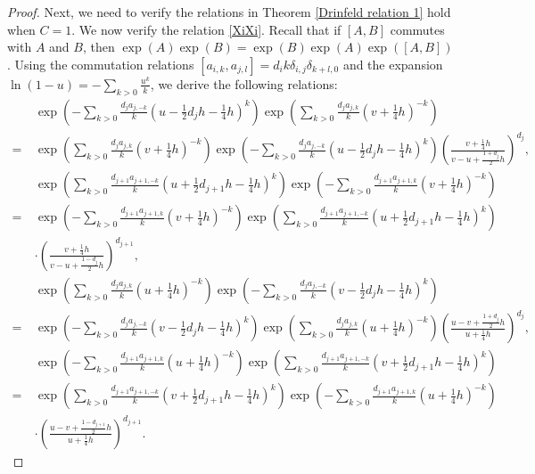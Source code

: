 \documentclass[a4paper,12pt]{article}
\numberwithin{equation}{section}
\begin{document}
\begin{proof}
Next, we need to verify the relations in Theorem \ref{Drinfeld relation 1} hold when $C=1$. We now verify the relation \eqref{XiXi}. Recall that if $[A,B]$ commutes with $A$ and $B$, then $\exp (A)\exp (B)=\exp (B)\exp (A)\exp ([A,B])$. Using the commutation relations $[a_{i,k},a_{j,l}]=d_{i}k\delta_{i,j}\delta_{k+l,0}$ and the expansion $\ln (1-u)=-\sum_{k>0}\frac{u^{k}}{k}$, we derive the following relations:
\begin{align*}
&\exp \left(-\sum_{k>0}\frac{d_{j}a_{j,-k}}{k}\left(u-\frac{1}{2}d_{j}h-\frac{1}{4}h\right)^{k}\right)\exp \left(\sum_{k>0}\frac{d_{j}a_{j,k}}{k}\left(v+\frac{1}{4}h\right)^{-k}\right)\\
=~&\exp \left(\sum_{k>0}\frac{d_{j}a_{j,k}}{k}\left(v+\frac{1}{4}h\right)^{-k}\right)\exp \left(-\sum_{k>0}\frac{d_{j}a_{j,-k}}{k}\left(u-\frac{1}{2}d_{j}h-\frac{1}{4}h\right)^{k}\right)\left(\frac{v+\frac{1}{4}h}{v-u+\frac{1+d_{j}}{2}h}\right)^{d_{j}},\\
&\exp \left(\sum_{k>0}\frac{d_{j+1}a_{j+1,-k}}{k}\left(u+\frac{1}{2}d_{j+1}h-\frac{1}{4}h\right)^{k}\right)\exp \left(-\sum_{k>0}\frac{d_{j+1}a_{j+1,k}}{k}\left(v+\frac{1}{4}h\right)^{-k}\right)\\
=~&\exp \left(-\sum_{k>0}\frac{d_{j+1}a_{j+1,k}}{k}\left(v+\frac{1}{4}h\right)^{-k}\right)\exp \left(\sum_{k>0}\frac{d_{j+1}a_{j+1,-k}}{k}\left(u+\frac{1}{2}d_{j+1}h-\frac{1}{4}h\right)^{k}\right)\\
&\cdot \left(\frac{v+\frac{1}{4}h}{v-u+\frac{1-d_{j}}{2}h}\right)^{d_{j+1}},\\
&\exp \left(\sum_{k>0}\frac{d_{j}a_{j,k}}{k}\left(u+\frac{1}{4}h\right)^{-k}\right)\exp \left(-\sum_{k>0}\frac{d_{j}a_{j,-k}}{k}\left(v-\frac{1}{2}d_{j}h-\frac{1}{4}h\right)^{k}\right)\\
=~&\exp \left(-\sum_{k>0}\frac{d_{j}a_{j,-k}}{k}\left(v-\frac{1}{2}d_{j}h-\frac{1}{4}h\right)^{k}\right)\exp \left(\sum_{k>0}\frac{d_{j}a_{j,k}}{k}\left(u+\frac{1}{4}h\right)^{-k}\right)\left(\frac{u-v+\frac{1+d_{j}}{2}h}{u+\frac{1}{4}h}\right)^{d_{j}},\\
&\exp \left(-\sum_{k>0}\frac{d_{j+1}a_{j+1,k}}{k}\left(u+\frac{1}{4}h\right)^{-k}\right)\exp \left(\sum_{k>0}\frac{d_{j+1}a_{j+1,-k}}{k}\left(v+\frac{1}{2}d_{j+1}h-\frac{1}{4}h\right)^{k}\right)\\
=~&\exp \left(\sum_{k>0}\frac{d_{j+1}a_{j+1,-k}}{k}\left(v+\frac{1}{2}d_{j+1}h-\frac{1}{4}h\right)^{k}\right)\exp \left(-\sum_{k>0}\frac{d_{j+1}a_{j+1,k}}{k}\left(u+\frac{1}{4}h\right)^{-k}\right)\\
&\cdot \left(\frac{u-v+\frac{1-d_{j+1}}{2}h}{u+\frac{1}{4}h}\right)^{d_{j+1}}.

\end{align*}
\end{proof}
\end{document}
